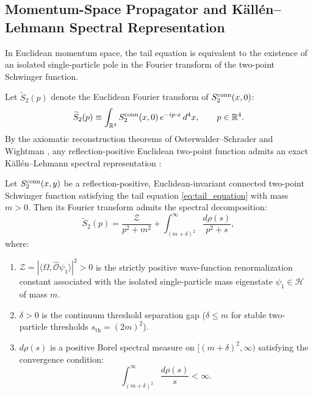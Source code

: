 \subsection{Momentum-Space Propagator and K\"all\'en--Lehmann Spectral Representation}
\label{subsec:kallen_lehmann}

In Euclidean momentum space, the tail equation is equivalent to the existence of an isolated single-particle pole in the Fourier transform of the two-point Schwinger function.

Let $\widetilde{S}_2(p)$ denote the Euclidean Fourier transform of $S_2^{\mathrm{conn}}(x, 0)$:
\begin{equation}
\label{eq:momentum_correlator_def}
\widetilde{S}_2(p) \equiv \int_{\mathbb{R}^4} S_2^{\mathrm{conn}}(x, 0) \, e^{-i p \cdot x} \, d^4x, \qquad p \in \mathbb{R}^4.
\end{equation}
By the axiomatic reconstruction theorems of Osterwalder--Schrader and Wightman \cite{OsterwalderSchrader1973,OsterwalderSchrader1975,StreaterWightman1964}, any reflection-positive Euclidean two-point function admits an exact K\"all\'en--Lehmann spectral representation \cite{Kallen1952,Lehmann1954}:

\begin{theorem}
\label{thm:kallen_lehmann}
Let $S_2^{\mathrm{conn}}(x, y)$ be a reflection-positive, Euclidean-invariant connected two-point Schwinger function satisfying the tail equation \eqref{eq:tail_equation} with mass $m > 0$. Then its Fourier transform admits the spectral decomposition:
\begin{equation}
\label{eq:kallen_lehmann_representation}
\widetilde{S}_2(p) = \frac{\mathcal{Z}}{p^2 + m^2} + \int_{(m + \delta)^2}^\infty \frac{d\rho(s)}{p^2 + s},
\end{equation}
where:
\begin{enumerate}
    \item $\mathcal{Z} = |\langle \Omega, \hat{\mathcal{O}} \psi_1 \rangle|^2 > 0$ is the strictly positive wave-function renormalization constant associated with the isolated single-particle mass eigenstate $\psi_1 \in \mathcal{H}$ of mass $m$.
    \item $\delta > 0$ is the continuum threshold separation gap ($\delta \le m$ for stable two-particle thresholds $s_{\mathrm{th}} = (2m)^2$).
    \item $d\rho(s)$ is a positive Borel spectral measure on $[(m + \delta)^2, \infty)$ satisfying the convergence condition:
    \begin{equation}
    \label{eq:spectral_measure_convergence}
    \int_{(m + \delta)^2}^\infty \frac{d\rho(s)}{s} < \infty.
    \end{equation}
\end{enumerate}
\end{theorem}

